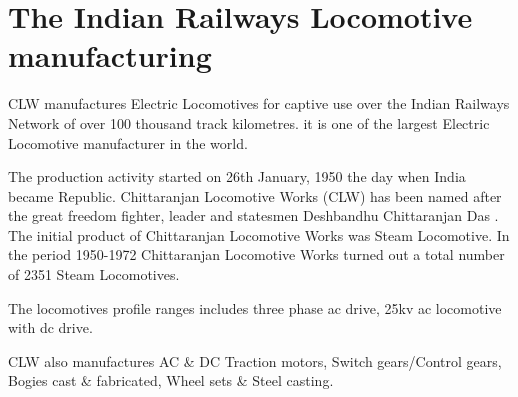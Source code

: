 \section{The Indian Railways Locomotive manufacturing}

CLW manufactures Electric Locomotives for captive use over the Indian Railways Network of over 100 thousand track kilometres. it is one of the largest Electric Locomotive manufacturer in the world.   


The production activity started on 26th January, 1950 the day when India became Republic. Chittaranjan Locomotive Works (CLW) has been named after the great freedom fighter, leader and statesmen Deshbandhu Chittaranjan Das .
 The initial product of Chittaranjan Locomotive Works was Steam Locomotive. In the period 1950-1972 Chittaranjan Locomotive Works turned out a total number of 2351 Steam Locomotives.


The locomotives profile ranges includes three phase ac drive, 25kv ac locomotive with dc drive. 


CLW also manufactures AC \& DC Traction motors, Switch gears/Control gears, Bogies cast \& fabricated, Wheel sets \& Steel casting.

